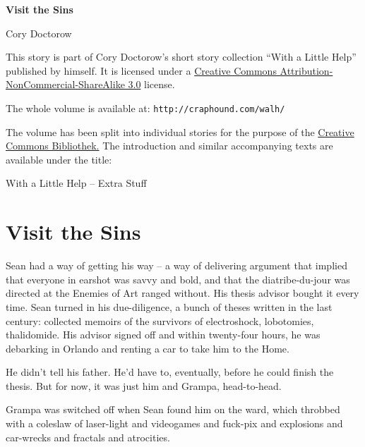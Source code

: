 


\raggedbottom

\begin{center}
\textbf{\huge\textsf{Visit the Sins}}

\medskip
Cory Doctorow

\end{center}

\bigskip

\begin{flushleft}
This story is part of Cory Doctorow’s short story collection
“With a Little Help” published by himself. It is licensed under a
\href{http://creativecommons.org/licenses/by-nc-sa/}
{Creative Commons Attribution-NonCommercial-ShareAlike 3.0} license.

\bigskip

The whole volume is available at:
\texttt{http://craphound.com/walh/}

\medskip

The volume has been split into individual stories for the purpose of the
\href{http://ccbib.org}{Creative Commons Bibliothek.}
The introduction and similar accompanying texts are available under the 
title:
\end{flushleft}
\begin{center}
With a Little Help -- Extra Stuff
\end{center}

\newpage

\section{Visit the Sins}

Sean had a way of getting his way -- a way of delivering argument that 
implied that everyone in earshot was savvy and bold, and that the 
diatribe-du-jour was directed at the Enemies of Art ranged without. His 
thesis advisor bought it every time. Sean turned in his due-diligence, 
a bunch of theses written in the last century: collected memoirs of the 
survivors of electroshock, lobotomies, thalidomide. His advisor signed 
off and within twenty-four hours, he was debarking in Orlando and 
renting a car to take him to the Home.

He didn't tell his father. He'd have to, eventually, before he could 
finish the thesis. But for now, it was just him and Grampa, 
head-to-head.

\tb

Grampa was switched off when Sean found him on the ward, which throbbed 
with a coleslaw of laser-light and videogames and fuck-pix and 
explosions and car-wrecks and fractals and atrocities.

